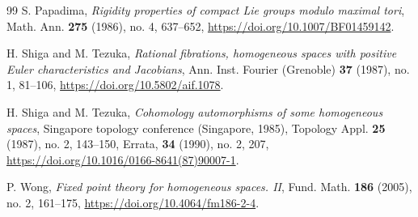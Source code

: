 \documentclass{amsart}
\begin{document}
\begin{thebibliography}{99}
 S. Papadima, \textit{Rigidity properties of compact Lie groups modulo maximal tori}, Math. Ann. \textbf{275} (1986), no. 4, 637--652, \url{https://doi.org/10.1007/BF01459142}.
	
 H. Shiga and M. Tezuka, \textit{Rational fibrations, homogeneous spaces with positive Euler characteristics and Jacobians}, Ann. Inst. Fourier (Grenoble) \textbf{37} (1987), no. 1, 81--106, \url{https://doi.org/10.5802/aif.1078}.
	
 H. Shiga and M. Tezuka, \textit{Cohomology automorphisms of some homogeneous spaces}, Singapore topology conference (Singapore, 1985), Topology Appl. \textbf{25} (1987), no. 2, 143--150, Errata, \textbf{34} (1990), no. 2, 207, \url{https://doi.org/10.1016/0166-8641(87)90007-1}.

 P. Wong, \textit{Fixed point theory for homogeneous spaces. II}, Fund. Math. \textbf{186} (2005), no. 2, 161--175, \url{https://doi.org/10.4064/fm186-2-4}.
\end{thebibliography}
\end{document}
